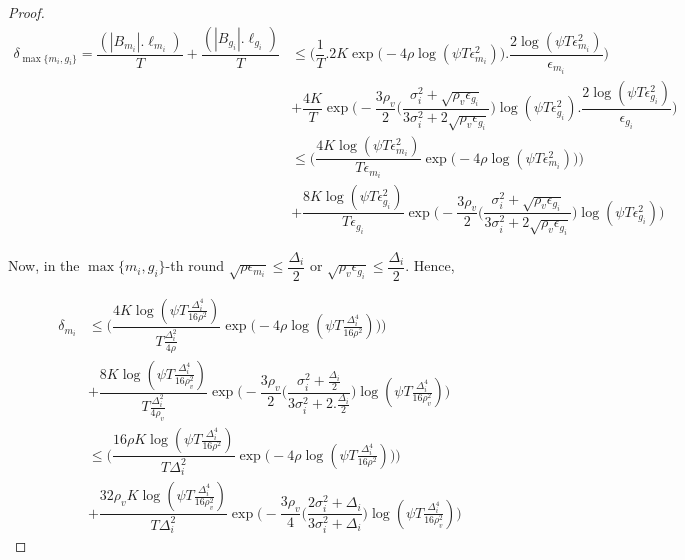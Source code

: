 \begin{proof}
\begin{align*}
\delta_{\max\lbrace m_{i}, g_{i}\rbrace}=\dfrac{(|B_{m_{i}}|.\ell_{m_{i}})}{T} + \dfrac{(|B_{g_{i}}|.\ell_{g_{i}})}{T} &\leq \bigg(\dfrac{1}{T}.2K\exp\big(-4\rho\log (\psi T\epsilon_{m_{i}}^{2})\big).\dfrac{2\log (\psi T \epsilon_{m_{i}}^{2})}{\epsilon_{m_{i}}}\bigg)\\ & + \dfrac{4K}{T}\exp\bigg(- \dfrac{3\rho_v}{2} \bigg(\dfrac{\sigma_{i}^{2}+\sqrt{\rho_{v}\epsilon_{g_{i}}}}{3\sigma_{i}^{2}+2\sqrt{\rho_v \epsilon_{g_{i}}}}\bigg) \log(\psi T\epsilon_{g_{i}}^{2}).\dfrac{2\log (\psi T \epsilon_{g_{i}}^{2})}{\epsilon_{g_{i}}} \bigg)\\
& \leq \bigg(\dfrac{4K\log (\psi T \epsilon_{m_{i}}^{2})}{T\epsilon_{m_{i}}}\exp\big(-4\rho\log (\psi T\epsilon_{m_{i}}^{2})\big)\bigg)\\
& + \dfrac{8K\log (\psi T \epsilon_{g_{i}}^{2})}{T\epsilon_{g_{i}}}\exp\bigg(- \dfrac{3\rho_v}{2} \bigg(\dfrac{\sigma_{i}^{2}+\sqrt{\rho_{v}\epsilon_{g_{i}}}}{3\sigma_{i}^{2}+2\sqrt{\rho_v \epsilon_{g_{i}}}}\bigg) \log(\psi T\epsilon_{g_{i}}^{2}) \bigg)
\end{align*}

Now, in the $\max\lbrace m_{i}, g_{i}\rbrace$-th round $\sqrt{\rho\epsilon_{m_{i}}}\leq \dfrac{\Delta_{i}}{2}$ or $\sqrt{\rho_v\epsilon_{g_{i}}}\leq \dfrac{\Delta_{i}}{2}$. Hence,

\begin{align*}
\delta_{m_{i}}& \leq \bigg(\dfrac{4K\log (\psi T \frac{\Delta_{i}^{4}}{16\rho^{2}})}{T\frac{\Delta_{i}^{2}}{4\rho}}\exp\big(-4\rho\log (\psi T\frac{\Delta_{i}^{4}}{16\rho^{2}})\big)\bigg)\\
& + \dfrac{8K\log (\psi T \frac{\Delta_{i}^{4}}{16\rho_{v}^{2}})}{T\frac{\Delta_{i}^{2}}{4\rho_{v}}}\exp\bigg(- \dfrac{3\rho_v}{2} \bigg(\dfrac{\sigma_{i}^{2}+\frac{\Delta_{i}}{2}}{3\sigma_{i}^{2}+2.\frac{\Delta_{i}}{2}}\bigg) \log(\psi T\frac{\Delta_{i}^{4}}{16\rho_{v}^{2}}) \bigg)\\
&\leq \bigg(\dfrac{16\rho K\log (\psi T \frac{\Delta_{i}^{4}}{16\rho^{2}})}{T\Delta_{i}^{2}}\exp\big(-4\rho\log (\psi T\frac{\Delta_{i}^{4}}{16\rho^{2}})\big)\bigg)\\
& + \dfrac{32\rho_v K\log (\psi T \frac{\Delta_{i}^{4}}{16\rho_{v}^{2}})}{T\Delta_{i}^{2}}\exp\bigg(- \dfrac{3\rho_v}{4} \bigg(\dfrac{2\sigma_{i}^{2}+\Delta_{i}}{3\sigma_{i}^{2}+\Delta_{i}}\bigg) \log(\psi T\frac{\Delta_{i}^{4}}{16\rho_{v}^{2}}) \bigg)
\end{align*}

%


\end{proof}
